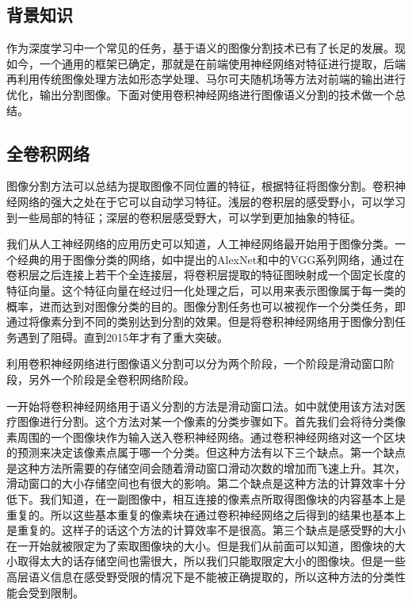 \begin{spacing}{2}
    \section{背景知识}
\end{spacing}
作为深度学习中一个常见的任务，基于语义的图像分割技术已有了长足的发展。现如今，一个通用的框架已确定，那就是在前端使用神经网络对特征进行提取，后端再利用传统图像处理方法如形态学处理、马尔可夫随机场等方法对前端的输出进行优化，输出分割图像。下面对使用卷积神经网络进行图像语义分割的技术做一个总结。
\subsection{全卷积网络}
图像分割方法可以总结为提取图像不同位置的特征，根据特征将图像分割。卷积神经网络的强大之处在于它可以自动学习特征。浅层的卷积层的感受野小，可以学习到一些局部的特征；深层的卷积层感受野大，可以学到更加抽象的特征。

我们从人工神经网络的应用历史可以知道，人工神经网络最开始用于图像分类。一个经典的用于图像分类的网络，如\cite{krizhevsky2012imagenet}中提出的AlexNet和\cite{simonyan2014very}中的VGG系列网络，通过在卷积层之后连接上若干个全连接层，将卷积层提取的特征图映射成一个固定长度的特征向量。这个特征向量在经过归一化处理之后，可以用来表示图像属于每一类的概率，进而达到对图像分类的目的。图像分割任务也可以被视作一个分类任务，即通过将像素分到不同的类别达到分割的效果。但是将卷积神经网络用于图像分割任务遇到了阻碍。直到2015年才有了重大突破。

利用卷积神经网络进行图像语义分割可以分为两个阶段，一个阶段是滑动窗口阶段，另外一个阶段是全卷积网络阶段。

一开始将卷积神经网络用于语义分割的方法是滑动窗口法。如\cite{ciresan2012deep}中就使用该方法对医疗图像进行分割。这个方法对某一个像素的分类步骤如下。首先我们会将待分类像素周围的一个图像块作为输入送入卷积神经网络。通过卷积神经网络对这一个区块的预测来决定该像素点属于哪一个分类。但这种方法有以下三个缺点。第一个缺点是这种方法所需要的存储空间会随着滑动窗口滑动次数的增加而飞速上升。其次，滑动窗口的大小存储空间也有很大的影响。第二个缺点是这种方法的计算效率十分低下。我们知道，在一副图像中，相互连接的像素点所取得图像块的内容基本上是重复的。所以这些基本重复的像素块在通过卷积神经网络之后得到的结果也基本上是重复的。这样子的话这个方法的计算效率不是很高。第三个缺点是感受野的大小在一开始就被限定为了索取图像块的大小。但是我们从前面可以知道，图像块的大小取得太大的话存储空间也需很大，所以我们只能取限定大小的图像块。但是一些高层语义信息在感受野受限的情况下是不能被正确提取的，所以这种方法的分类性能会受到限制。

